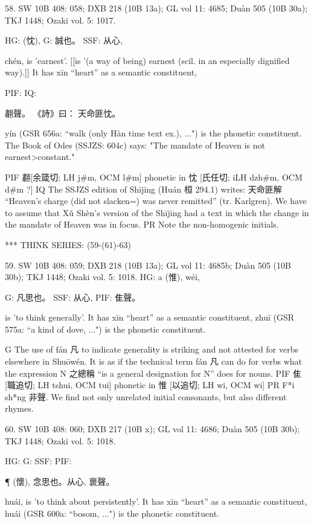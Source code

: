 58. SW 10B 408: 058; DXB 218 (10B 13a); GL vol 11: 4685; Duàn 505 (10B 30a); TKJ 1448; Ozaki vol. 5: 1017.

HG:             (忱),
G:	誠也。
SSF: 从心,


chén,
is 'earnest'. [[is '(a way of being) earnest (scil. in an especially dignified way).]]
It has xīn ``heart'' as a semantic constituent,

PIF: IQ:

䎘聲。
《詩》曰： 天命匪忱。

yín (GSR 656a: ``walk (only Hàn time text ex.), ...") is the phonetic constituent.
The Book of Odes (SSJZS: 604c) says:
"The mandate of Heaven is not earnest>constant."

PIF  䎘[余箴切; LH j\#m, OCM l\#m] phonetic in 忱 [氏任切; iLH dzh\#m, OCM d\#m ?]
IQ The SSJZS edition of Shījīng (Huán 桓 294.1) writes: 天命匪解 ``Heaven's charge (did not slacken=) was never remitted'' (tr. Karlgren). We have to assume that Xǔ Shèn's version of the Shījīng had a text in which the change in the mandate of Heaven was in focus.
PR   Note the non-homogenic initials.

***
THINK SERIES: (59-(61)-63)

59. SW 10B 408: 059; DXB 218 (10B 13a); GL vol 11: 4685b; Duàn 505 (10B 30b); TKJ 1448; Ozaki vol. 5: 1018.
HG: a (惟), wéi,

G:	凡思也。
SSF: 从心,
PIF: 隹聲。

is 'to think generally'.
It has xīn ``heart'' as a semantic constituent,
zhuī (GSR 575a: ``a kind of dove, ...") is the phonetic constituent.



G The use of fán 凡 to indicate generality is striking and not attested for verbs elsewhere in Shuōwén. It is as if the technical term fán 凡 can do for verbs what the expression N 之總稱 ``is a general designation for N'' does for nouns.
PIF    隹[職追切; LH tshui, OCM tui] phonetic in 惟 [以追切; LH wi, OCM wi]
PR     F*i sh*ng 非聲. We find not only unrelated initial consonants, but also different rhymes.

60. SW 10B 408: 060; DXB 217 (10B x); GL vol 11: 4686; Duàn 505 (10B 30b); TKJ 1448; Ozaki vol. 5: 1018.


HG:
G: SSF: PIF:

¶ (懷), 念思也。从心,
褱聲。


huái,
is 'to think about persistently'.
It has xīn ``heart'' as a semantic constituent,
huái (GSR 600a: ``bosom, ...") is the phonetic constituent.

